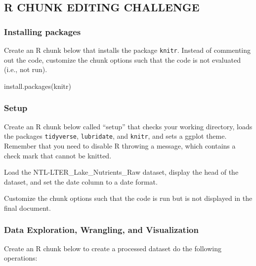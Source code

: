 \documentclass[
]{article}
\newenvironment{Shaded}{\begin{snugshade}}{\end{snugshade}}
\newcommand{\FunctionTok}[1]{\textcolor[rgb]{0.00,0.00,0.00}{#1}}
\newcommand{\NormalTok}[1]{#1}
\newcommand{\StringTok}[1]{\textcolor[rgb]{0.31,0.60,0.02}{#1}}
\begin{document}
\hypertarget{r-chunk-editing-challenge}{%
\subsection{R CHUNK EDITING CHALLENGE}\label{r-chunk-editing-challenge}}

\hypertarget{installing-packages}{%
\subsubsection{Installing packages}\label{installing-packages}}

Create an R chunk below that installs the package \texttt{knitr}.
Instead of commenting out the code, customize the chunk options such
that the code is not evaluated (i.e., not run).

\begin{Shaded}
\begin{Highlighting}[]
\FunctionTok{install.packages}\NormalTok{(}\StringTok{\textquotesingle{}knitr\textquotesingle{}}\NormalTok{)}
\end{Highlighting}
\end{Shaded}

\hypertarget{setup}{%
\subsubsection{Setup}\label{setup}}

Create an R chunk below called ``setup'' that checks your working
directory, loads the packages \texttt{tidyverse}, \texttt{lubridate},
and \texttt{knitr}, and sets a ggplot theme. Remember that you need to
disable R throwing a message, which contains a check mark that cannot be
knitted.

Load the NTL-LTER\_Lake\_Nutrients\_Raw dataset, display the head of the
dataset, and set the date column to a date format.

Customize the chunk options such that the code is run but is not
displayed in the final document.

\hypertarget{data-exploration-wrangling-and-visualization}{%
\subsubsection{Data Exploration, Wrangling, and
Visualization}\label{data-exploration-wrangling-and-visualization}}

Create an R chunk below to create a processed dataset do the following
operations:
\end{document}
